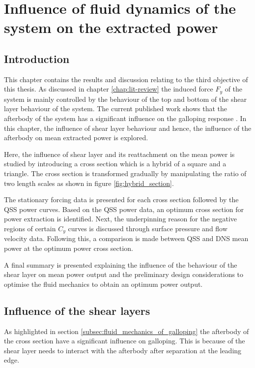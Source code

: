 \chapter{Influence of fluid dynamics of the system on the extracted power}

\section{Introduction}

This chapter contains the results and discussion relating to the third objective of this thesis. As discussed in chapter \ref{chap:lit-review} the induced force $F_y$ of the system is mainly controlled by the behaviour of the top and bottom of the shear layer behaviour of the system. The current published work shows that the afterbody of the system has a significant influence on the galloping response \citep{Luo1994}. In this chapter, the influence of shear layer behaviour and hence, the influence of the afterbody on mean extracted power is explored.

Here, the influence of shear layer and its reattachment on the mean power is studied by introducing a cross section which is a hybrid of a square and a triangle. The cross section is transformed gradually by manipulating the ratio of two length scales as shown in figure \ref{fig:hybrid_section}.

The stationary forcing data is presented for each cross section followed by the QSS power curves. Based on the QSS power data, an optimum cross section for power extraction is identified. Next, the underpinning reason for the negative regions of certain $C_y$ curves is discussed through surface pressure and flow velocity data. Following this, a comparison is made between QSS and DNS mean power at the optimum power cross section.       

A final summary is presented explaining the influence of the behaviour of the shear layer on mean power output and the preliminary design considerations to optimise the fluid mechanics to obtain an optimum power output. 


\section{Influence of the shear layers}

As highlighted in section \ref{subsec:fluid_mechanics_of_galloping} the afterbody of the cross section have a significant influence on galloping. This is because of the shear layer needs to interact with the afterbody after separation at the leading edge. 


